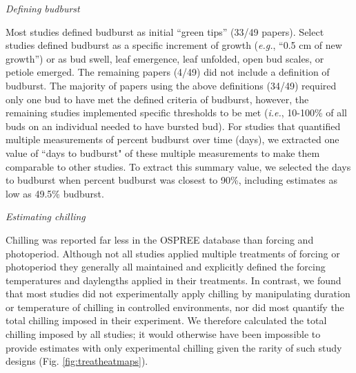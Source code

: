 \documentclass{article}
\begin{document}
\par \emph{Defining budburst}

Most studies defined budburst as initial ``green tips'' (33/49 papers). Select studies defined budburst as a specific increment of growth (\emph{e.g.}, ``0.5 cm of new growth'') or as bud swell, leaf emergence, leaf unfolded, open bud scales, or petiole emerged. The remaining papers (4/49) did not include a definition of budburst. The majority of papers using the above definitions (34/49) required only one bud to have met the defined criteria of budburst, however, the remaining studies implemented specific thresholds to be met (\emph{i.e.}, 10-100\% of all buds on an individual needed to have bursted bud). For studies that quantified multiple measurements of percent budburst over time (days), we extracted one value of ``days to budburst" of these multiple measurements to make them comparable to other studies. To extract this summary value, we selected the days to budburst when percent budburst was closest to 90\%, including estimates as low as 49.5\% budburst. 

\par{\emph{Estimating chilling}}

Chilling was reported far less in the OSPREE database than forcing and photoperiod. Although not all studies applied multiple treatments of forcing or photoperiod they generally all maintained and explicitly defined the forcing temperatures and daylengths applied in their treatments. In contrast, we found that most studies did not experimentally apply chilling by manipulating duration or temperature of chilling in controlled environments, nor did most quantify the total chilling imposed in their experiment. We therefore calculated the total chilling imposed by all studies;  it would otherwise have been impossible to provide estimates with only experimental chilling given the rarity of such study designs (Fig. \ref{fig:treatheatmaps}). 
\end{document}
